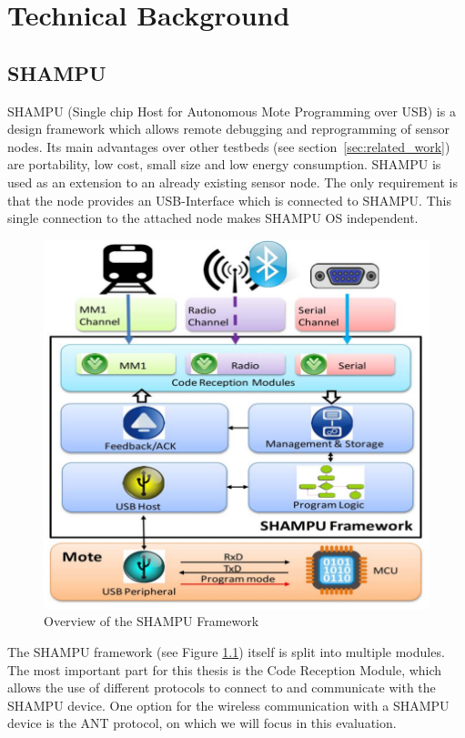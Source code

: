 \chapter{Technical Background}
\section{SHAMPU}
SHAMPU (Single chip Host for Autonomous Mote Programming over USB) \cite{Smeets:2014:DAL:2602339.2602401} is a design framework which allows remote debugging and reprogramming of sensor nodes. Its main advantages over other testbeds (see section~\ref{sec:related_work}) are portability, low cost, small size and low energy consumption. SHAMPU is used as an extension to an already existing sensor node. The only requirement is that the node provides an USB-Interface which is connected to SHAMPU. This single connection to the attached node makes SHAMPU OS independent.
\begin{figure}[H]
	\centering
	\includegraphics[scale=.5]{content/images/SHAMPUframework.png}
	\caption{Overview of the SHAMPU Framework \cite{Smeets:2014:DAL:2602339.2602401}}\label{fig:shampuframework}
\end{figure}
The SHAMPU framework (see Figure \ref{fig:shampuframework}) itself is split into multiple modules. The most important part for this thesis is the Code Reception Module, which allows the use of different protocols to connect to and communicate with the SHAMPU device. One option for the wireless communication with a SHAMPU device is the ANT protocol, on which we will focus in this evaluation.

